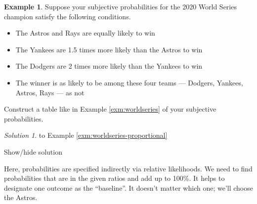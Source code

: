 \documentclass[
]{book}
\providecommand{\tightlist}{%
  \setlength{\itemsep}{0pt}\setlength{\parskip}{0pt}}
\theoremstyle{definition}
\theoremstyle{definition}
\newtheorem{example}{Example}[chapter]
\theoremstyle{definition}
\theoremstyle{remark}
\newtheorem*{solution}{Solution}
\begin{document}
\begin{example}
\protect\hypertarget{exm:worldseries-proportional}{}{\label{exm:worldseries-proportional} }
Suppose your subjective probabilities for the 2020 World Series champion satisfy the following conditions.

\begin{itemize}
\tightlist
\item
  The Astros and Rays are equally likely to win
\item
  The Yankees are 1.5 times more likely than the Astros to win
\item
  The Dodgers are 2 times more likely than the Yankees to win
\item
  The winner is as likely to be among these four teams --- Dodgers, Yankees, Astros, Rays --- as not
\end{itemize}

Construct a table like in Example \ref{exm:worldseries} of your subjective probabilities.
\end{example}

\begin{solution}
{}
to Example \ref{exm:worldseries-proportional}
\end{solution}

Show/hide solution

Here, probabilities are specified indirectly via relative likelihoods. We need to find probabilities that are in the given ratios and add up to 100\%. It helps to designate one outcome as the ``baseline''. It doesn't matter which one; we'll choose the Astros.
\end{document}
